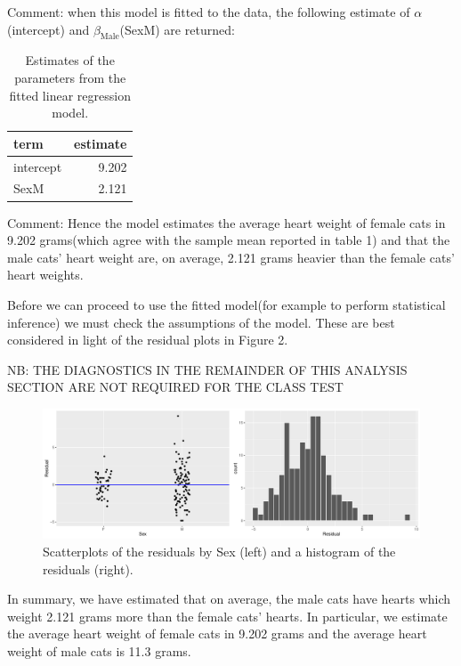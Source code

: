 \documentclass[
]{article}
\begin{document}
Comment: when this model is fitted to the data, the following estimate
of \(\alpha\)(intercept) and \(\beta_{\mbox{Male}}\)(SexM) are returned:

\begin{table}[H]

\caption{\label{tab:unnamed-chunk-2}\label{tab:reg} Estimates of the parameters from the fitted linear
    regression model.}
\centering
\begin{tabular}[t]{l|r}
\hline
term & estimate\\
\hline
intercept & 9.202\\
\hline
SexM & 2.121\\
\hline
\end{tabular}
\end{table}

Comment: Hence the model estimates the average heart weight of female
cats in 9.202 grams(which agree with the sample mean reported in table
1) and that the male cats' heart weight are, on average, 2.121 grams
heavier than the female cats' heart weights.

Before we can proceed to use the fitted model(for example to perform
statistical inference) we must check the assumptions of the model. These
are best considered in light of the residual plots in Figure 2.

NB: THE DIAGNOSTICS IN THE REMAINDER OF THIS ANALYSIS SECTION ARE NOT
REQUIRED FOR THE CLASS TEST

\begin{figure}[H]

{\centering \includegraphics{2561551_PracticeClassTest_files/figure-latex/residplots-1} 

}

\caption{\label{fig:resids} Scatterplots of the residuals by Sex (left) and a histogram of the residuals (right).}\label{fig:residplots}
\end{figure}

In summary, we have estimated that on average, the male cats have hearts
which weight 2.121 grams more than the female cats' hearts. In
particular, we estimate the average heart weight of female cats in 9.202
grams and the average heart weight of male cats is 11.3 grams.
\end{document}
